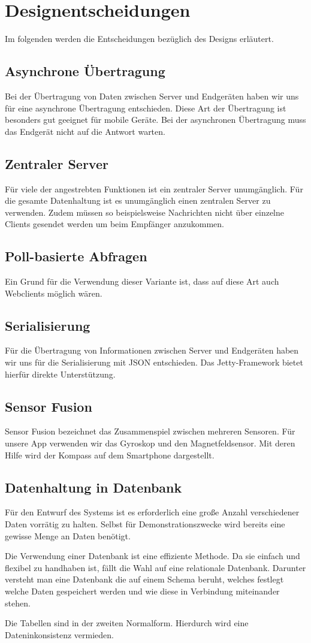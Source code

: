 \chapter{Designentscheidungen}
Im folgenden werden die Entscheidungen bezüglich des Designs erläutert.

\section{Asynchrone Übertragung}
Bei der Übertragung von Daten zwischen Server und Endgeräten haben wir uns für eine asynchrone Übertragung entschieden. Diese Art der Übertragung ist besonders gut geeignet für mobile Geräte. Bei der asynchronen Übertragung muss das Endgerät nicht auf die Antwort warten.

\section{Zentraler Server}
Für viele der angestrebten Funktionen ist ein zentraler Server unumgänglich. Für die gesamte Datenhaltung ist es unumgänglich einen zentralen Server zu verwenden. Zudem müssen so beispielsweise Nachrichten nicht über einzelne Clients gesendet werden um beim Empfänger anzukommen. 

\section{Poll-basierte Abfragen}
Ein Grund für die Verwendung dieser Variante ist, dass auf diese Art auch Webclients möglich wären. 

\section{Serialisierung}
Für die Übertragung von Informationen zwischen Server und Endgeräten haben wir uns für die Serialisierung mit JSON entschieden. Das Jetty-Framework bietet hierfür direkte Unterstützung.

\section{Sensor Fusion}
Sensor Fusion bezeichnet das Zusammenspiel zwischen mehreren Sensoren. Für unsere App verwenden wir das Gyroskop und den Magnetfeldsensor. Mit deren Hilfe wird der Kompass auf dem Smartphone dargestellt. 

\section{Datenhaltung in Datenbank}
Für den Entwurf des Systems ist es erforderlich eine große Anzahl verschiedener Daten vorrätig zu halten. Selbst für Demonstrationszwecke wird bereits eine gewisse Menge an Daten benötigt.

Die Verwendung einer Datenbank ist eine effiziente Methode. Da sie einfach und flexibel zu handhaben ist, fällt die Wahl auf eine relationale Datenbank. Darunter versteht man eine Datenbank die auf einem Schema beruht, welches festlegt welche Daten gespeichert werden und wie diese in Verbindung miteinander stehen.

Die Tabellen sind in der zweiten Normalform. Hierdurch wird eine Dateninkonsistenz vermieden.
